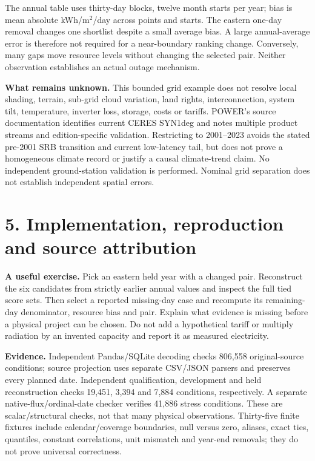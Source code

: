 \documentclass[10pt,letterpaper]{article}
\begin{document}
The annual table uses thirty-day blocks, twelve month starts per year; bias is mean absolute kWh/m$^2$/day across points and starts. The eastern one-day removal changes one shortlist despite a small average bias. A large annual-average error is therefore not required for a near-boundary ranking change. Conversely, many gaps move resource levels without changing the selected pair. Neither observation establishes an actual outage mechanism.

\textbf{What remains unknown.} This bounded grid example does not resolve local shading, terrain, sub-grid cloud variation, land rights, interconnection, system tilt, temperature, inverter loss, storage, costs or tariffs. POWER's source documentation identifies current CERES SYN1deg and notes multiple product streams and edition-specific validation. Restricting to 2001--2023 avoids the stated pre-2001 SRB transition and current low-latency tail, but does not prove a homogeneous climate record or justify a causal climate-trend claim. No independent ground-station validation is performed. Nominal grid separation does not establish independent spatial errors.
\newpage
\section*{5. Implementation, reproduction and source attribution}
\textbf{A useful exercise.} Pick an eastern held year with a changed pair. Reconstruct the six candidates from strictly earlier annual values and inspect the full tied score sets. Then select a reported missing-day case and recompute its remaining-day denominator, resource bias and pair. Explain what evidence is missing before a physical project can be chosen. Do not add a hypothetical tariff or multiply radiation by an invented capacity and report it as measured electricity.

\textbf{Evidence.} Independent Pandas/SQLite decoding checks 806,558 original-source conditions; source projection uses separate CSV/JSON parsers and preserves every planned date. Independent qualification, development and held reconstruction checks 19,451, 3,394 and 7,884 conditions, respectively. A separate native-flux/ordinal-date checker verifies 41,886 stress conditions. These are scalar/structural checks, not that many physical observations. Thirty-five finite fixtures include calendar/coverage boundaries, null versus zero, aliases, exact ties, quantiles, constant correlations, unit mismatch and year-end removals; they do not prove universal correctness.
\end{document}
